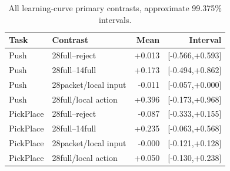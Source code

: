 \begin{table}[H]\centering\small
\caption{All learning-curve primary contrasts, approximate 99.375\% intervals.}\label{s-tab:curveall}
\begin{tabular}{llrr}
\toprule Task & Contrast & Mean & Interval\\\midrule
Push & 28full--reject & +0.013 & [-0.566,+0.593]\\
Push & 28full--14full & +0.173 & [-0.494,+0.862]\\
Push & 28packet/local input & -0.011 & [-0.057,+0.000]\\
Push & 28full/local action & +0.396 & [-0.173,+0.968]\\
PickPlace & 28full--reject & -0.087 & [-0.333,+0.155]\\
PickPlace & 28full--14full & +0.235 & [-0.063,+0.568]\\
PickPlace & 28packet/local input & -0.000 & [-0.121,+0.128]\\
PickPlace & 28full/local action & +0.050 & [-0.130,+0.238]\\
\bottomrule\end{tabular}\end{table}
